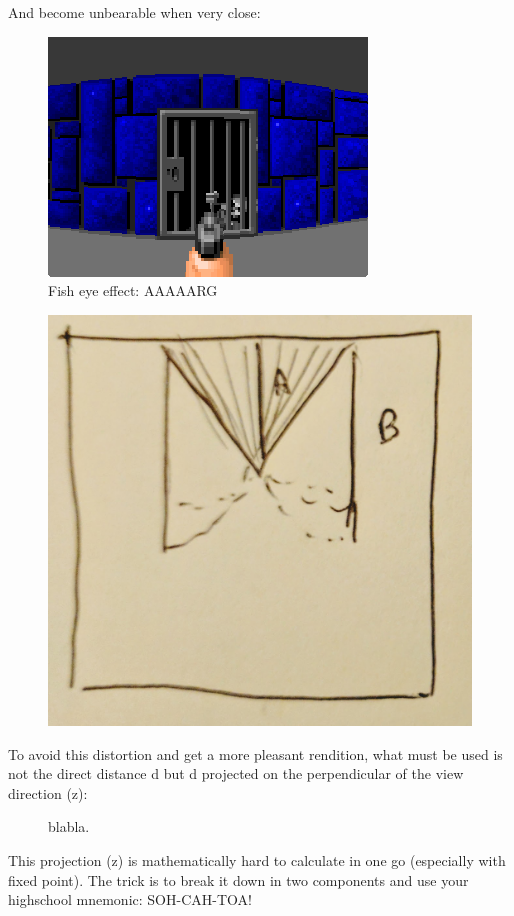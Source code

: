 And become unbearable when very close:
 \begin{figure}[H]
\centering
 \includegraphics[width=\textwidth]{imgs/fish_eye/bad_bad.png}
 \caption{Fish eye effect: AAAAARG} \label{fig:mips}
 \end{figure}
 \begin{figure}[H]
  \centering
 \includegraphics[width=.3\textwidth]{imgs/fish_eye/fish_eye_top_close.png}
\end{figure}
\par
 
To avoid this distortion and get a more pleasant rendition, what must be used is not the direct distance d but d projected on the perpendicular of the view direction (z):

\begin{figure}[H]
\centering
 
 \caption{blabla.} \label{fig:Raycasting2}
\end{figure}

This projection (z) is mathematically hard to calculate in one go (especially with fixed point). The trick is to break it down in two components and use your highschool mnemonic: SOH-CAH-TOA!\\

